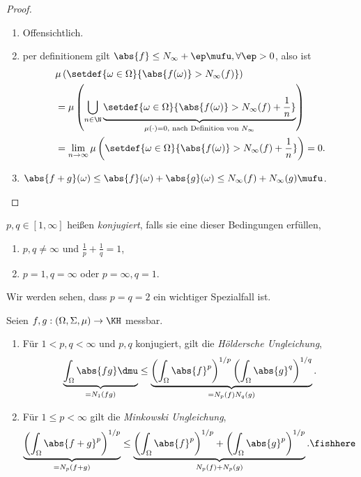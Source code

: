\begin{proof}
\begin{enumerate}[label=\arabic{*}.)]
  \item Offensichtlich.
  \item per definitionem gilt $\abs{f}\le N_\infty+\ep \mufu, \forall\ep > 0$,
  also ist
\begin{align*}
&\mu\left(\setdef{\omega\in\Omega}{\abs{f(\omega)}> N_\infty(f)}\right) \\
&= \mu\left(\bigcup_{n\in\N}
\underbrace{\setdef{\omega\in\Omega}%
{\abs{f(\omega)}> N_\infty(f)+\frac{1}{n}}}_{\mu(\cdot) = 0, \text{ nach
Definition von } N_\infty}\right) \\ &= \lim\limits_{n\to\infty} \mu\left(\setdef{\omega\in\Omega}{\abs{f(\omega)}> N_\infty(f)+\frac{1}{n}}\right)
= 0.
\end{align*}
\item $\abs{f+g}(\omega) \le\abs{f}(\omega) + \abs{g}(\omega) \le N_\infty(f) +
N_\infty(g) \mufu$.\qedhere
\end{enumerate}
\end{proof}

\begin{defn}
\label{defn:3.65}
$p,q\in[1,\infty]$ heißen \emph{konjugiert}, falls sie eine dieser
Bedingungen erfüllen,
\begin{enumerate}[label=(\roman{*})]
  \item $p,q\neq \infty$ und $\frac{1}{p}+\frac{1}{q} = 1$,
  \item $p=1, q=\infty$ oder $p=\infty, q= 1$.\fishhere
\end{enumerate}
\end{defn}
Wir werden sehen, dass $p=q=2$ ein wichtiger Spezialfall ist.
\begin{prop}
\label{prop:3.66}
Seien $f,g:(\Omega,\Sigma,\mu)\to\KH$ messbar.
\begin{enumerate}[label=\arabic{*}.)]
  \item Für $1<p, q<\infty$ und $p,q$ konjugiert, gilt die \emph{Höldersche
  Ungleichung},
\begin{align*}
\underbrace{\int_\Omega \abs{fg}\dmu}_{=N_1(fg)} \le
\underbrace{\left(\int_\Omega
\abs{f}^p \right)^{1/p} \left(\int_\Omega \abs{g}^q
\right)^{1/q}}_{=N_p(f)N_q(g)}.
\end{align*}
\item Für $1\le p<\infty$ gilt die \emph{Minkowski Ungleichung},
\begin{align*}
\underbrace{\left(\int_\Omega \abs{f+g}^p\right)^{1/p}}_{=N_p(f+g)}
\le \underbrace{\left(\int_\Omega \abs{f}^p\right)^{1/p} + \left(\int_\Omega
\abs{g}^p\right)^{1/p}}_{N_p(f)+N_p(g)}.\fishhere
\end{align*}
\end{enumerate}
\end{prop}

